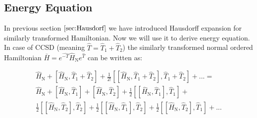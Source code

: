 \documentclass[twoside,english]{uiofysmaster}
\theoremstyle{definition}
\begin{document}
\subsection{Energy Equation}
In previous section $\ref{sec:Hausdorf}$ we have introduced Hausdorff expansion for similarly transformed Hamiltonian. Now we will use it to derive energy equation. In case of CCSD (meaning $\hat{T}=\hat{T}_1+\hat{T}_2$) the similarly transformed normal ordered Hamiltonian $\bar{H}=e^{\hat{-T}} \hat{H}_\text{N} e^{\hat{T}}$ can be written as:

\begin{eqnarray}\label{eq:hausdorf_ccsd}
 \hat{H}_\text{N} + [\hat{H}_\text{N},\hat{T}_1+\hat{T}_2] + \frac{1}{2!}[[\hat{H}_\text{N},\hat{T}_1+\hat{T}_2],\hat{T}_1+\hat{T}_2] + ...= \nonumber\\
 \hat{H}_\text{N} + [\hat{H}_\text{N},\hat{T}_1] + [\hat{H}_\text{N},\hat{T}_2] + \frac{1}{2}[[\hat{H}_\text{N},\hat{T}_1],\hat{T}_1] +\nonumber\\ \frac{1}{2}[[\hat{H}_\text{N},\hat{T}_2],\hat{T}_2] +  \frac{1}{2}[[\hat{H}_\text{N},\hat{T}_1],\hat{T}_2] + \frac{1}{2}[[\hat{H}_\text{N},\hat{T}_2],\hat{T}_1] + ...
\end{eqnarray}
\end{document}
